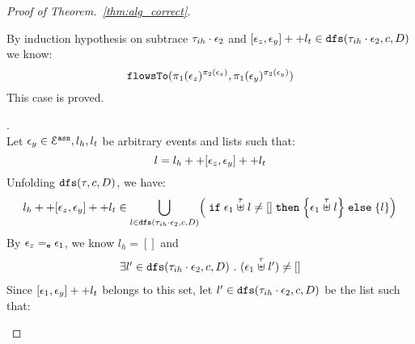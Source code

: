 \begin{proof}[Proof of Theorem.~\ref{thm:alg_correct}]
\begin{case}
\begin{subcase}
\begin{subsubcase}
%
%
By induction hypothesis on subtrace $\mathtt{\tau}_{ih} \cdot \mathtt{\epsilon}_2$ and $[\mathtt{\epsilon}_z, \mathtt{\epsilon}_y] ++ l_t 
  \in \mathtt{dfs}(\mathtt{\tau}_{ih} \cdot \mathtt{\epsilon}_2, c, D)$ we know:
\[
  \mathtt{flowsTo}(\pi_1(\mathtt{\epsilon}_z)^{\pi_2(\mathtt{\epsilon}_z)}, \pi_1(\mathtt{\epsilon}_y)^{\pi_2(\mathtt{\epsilon}_y)})
\]
This case is proved.
%
\end{subsubcase}
%
\begin{subsubcase}.
\\
Let $\mathtt{\epsilon}_y \in \mathcal{E}^{\mathtt{{asn}}}, l_h, l_t$ be arbitrary events and lists such that:
\[                                                                                                                                                                                                                                                                                                                                                                                                          
  l = l_h ++ [\mathtt{\epsilon}_z, \mathtt{\epsilon}_y] ++ l_t 
\]
%
Unfolding $\mathtt{dfs}(\mathtt{\tau}, c, D)$, we have:
%
\[
  l_h ++ [\event_z, \event_y] ++ l_t  \in 
     \bigcup\limits_{l \in \kw{dfs}(\trace_{ih} \cdot \event_2, c, D) }
  \left(  \eif \event_1 \stackrel{\trace}{\uplus} l \neq [] 
  \ethen \left\{ \event_1 \stackrel{\trace}{\uplus} l \right\} \eelse \left\{ l \right\}
  \right)
  \]
By $\mathtt{\epsilon}_z =_{\mathtt{e}} \mathtt{\epsilon}_1$, we know $l_h = []$ and 
%
\[
\begin{array}{l}
  \exists l' \in \mathtt{dfs}(\mathtt{\tau}_{ih}\cdot \mathtt{\epsilon}_2, c, D) ~.~
   (\mathtt{\epsilon}_1 \stackrel{\mathtt{\tau}}{\uplus} l') \neq []
\end{array}
\]
%
Since $[\mathtt{\epsilon}_1, \mathtt{\epsilon}_y] ++ l_t $ belongs to this set, let $l' \in \mathtt{dfs}(\mathtt{\tau}_{ih}\cdot \mathtt{\epsilon}_2, c, D)$ be the list such that:

\end{subsubcase}
\end{subcase}
\end{case}
\end{proof}
